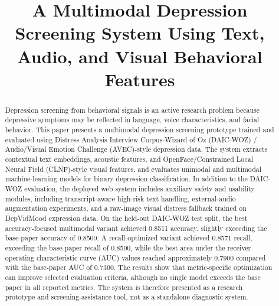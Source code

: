 \documentclass[conference]{IEEEtran}
\begin{document}
\title{A Multimodal Depression Screening System Using Text, Audio, and Visual Behavioral Features}

\author{
\and
{}
}

\maketitle

\begin{abstract}
Depression screening from behavioral signals is an active research problem because depressive symptoms may be reflected in language, voice characteristics, and facial behavior. This paper presents a multimodal depression screening prototype trained and evaluated using Distress Analysis Interview Corpus-Wizard of Oz (DAIC-WOZ) / Audio/Visual Emotion Challenge (AVEC)-style depression data. The system extracts contextual text embeddings, acoustic features, and OpenFace/Constrained Local Neural Field (CLNF)-style visual features, and evaluates unimodal and multimodal machine-learning models for binary depression classification. In addition to the DAIC-WOZ evaluation, the deployed web system includes auxiliary safety and usability modules, including transcript-aware high-risk text handling, external-audio augmentation experiments, and a raw-image visual distress fallback trained on DepVidMood expression data. On the held-out DAIC-WOZ test split, the best accuracy-focused multimodal variant achieved 0.8511 accuracy, slightly exceeding the base-paper accuracy of 0.8500. A recall-optimized variant achieved 0.8571 recall, exceeding the base-paper recall of 0.8500, while the best area under the receiver operating characteristic curve (AUC) values reached approximately 0.7900 compared with the base-paper AUC of 0.7300. The results show that metric-specific optimization can improve selected evaluation criteria, although no single model exceeds the base paper in all reported metrics. The system is therefore presented as a research prototype and screening-assistance tool, not as a standalone diagnostic system.
\end{abstract}
\end{document}
